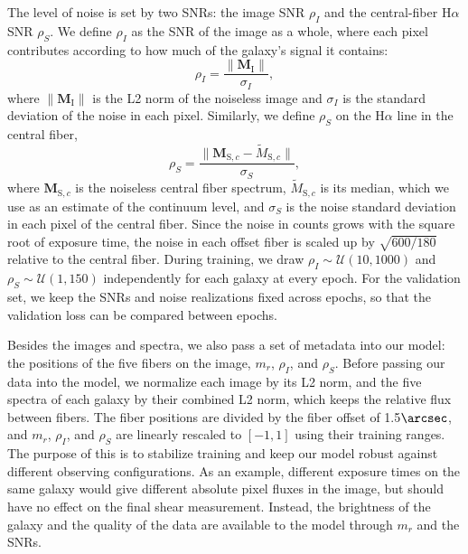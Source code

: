 The level of noise is set by two SNRs: the image SNR $\rho_I$ and the central-fiber H$\alpha$ SNR $\rho_S$. We define $\rho_I$ as the SNR of the image as a whole, where each pixel contributes according to how much of the galaxy's signal it contains:
\begin{equation}
\label{eqn:snr-image}
    \rho_I = \frac{\lVert \bm{M}_\mathrm{I} \rVert}{\sigma_I},
\end{equation}
where $\lVert \bm{M}_\mathrm{I} \rVert$ is the L2 norm of the noiseless image and $\sigma_I$ is the standard deviation of the noise in each pixel. Similarly, we define $\rho_S$ on the H$\alpha$ line in the central fiber,
\begin{equation}
\label{eqn:snr-spec}
    \rho_S = \frac{\lVert \bm{M}_{\mathrm{S},c} - \tilde{M}_{\mathrm{S},c} \rVert}{\sigma_S},
\end{equation}
where $\bm{M}_{\mathrm{S},c}$ is the noiseless central fiber spectrum, $\tilde{M}_{\mathrm{S},c}$ is its median, which we use as an estimate of the continuum level, and $\sigma_S$ is the noise standard deviation in each pixel of the central fiber. Since the noise in counts grows with the square root of exposure time, the noise in each offset fiber is scaled up by $\sqrt{600/180}$ relative to the central fiber. During training, we draw $\rho_I \sim \mathcal{U}(10, 1000)$ and $\rho_S \sim \mathcal{U}(1, 150)$ independently for each galaxy at every epoch. For the validation set, we keep the SNRs and noise realizations fixed across epochs, so that the validation loss can be compared between epochs.

Besides the images and spectra, we also pass a set of metadata into our model: the positions of the five fibers on the image, $m_r$, $\rho_I$, and $\rho_S$.  Before passing our data into the model, we normalize each image by its L2 norm, and the five spectra of each galaxy by their combined L2 norm, which keeps the relative flux between fibers. The fiber positions are divided by the fiber offset of 1.5$\arcsec$, and $m_r$, $\rho_I$, and $\rho_S$ are linearly rescaled to $[-1, 1]$ using their training ranges. The purpose of this is to stabilize training and keep our model robust against different observing configurations. As an example, different exposure times on the same galaxy would give different absolute pixel fluxes in the image, but should have no effect on the final shear measurement. Instead, the brightness of the galaxy and the quality of the data are available to the model through $m_r$ and the SNRs.

